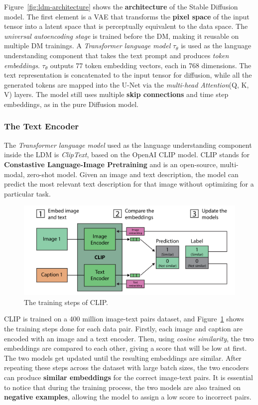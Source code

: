 \documentclass[preprint]{elsarticle}
\begin{document}
Figure~\ref{fig:ldm-architecture} shows the \textbf{architecture} of the Stable Diffusion model.
The first element is a VAE that transforms the \textbf{pixel space} of the input tensor into a latent space that is  perceptually equivalent to the data space. The \emph{universal autoencoding stage} is trained before the DM,  making it reusable on multiple DM trainings. A \emph{Transformer language model} $\tau_\theta$ is used as the language understanding component  that takes the text prompt and produces \emph{token embeddings}. $\tau_\theta$ outputs 77 token embedding vectors, each in 768 dimensions. 
The text representation is concatenated to the input tensor for diffusion, while all the generated tokens are mapped into the  U-Net via the \emph{multi-head Attention}(Q, K, V) layers. The model still uses multiple \textbf{skip connections} and time step embeddings,
as in the pure Diffusion model.



\subsubsection{The Text Encoder}

The \emph{Transformer language model} used as the language understanding component inside the LDM is \emph{ClipText}, based on the OpenAI CLIP model.
CLIP stands for \textbf{Constastive Language-Image Pretraining} and is an open-source, multi-modal, zero-shot model. 
Given an image and text description, the model can predict the most relevant text description for that image without 
optimizing for a particular task.

\begin{figure}[t]
	\centering
    \includegraphics[scale=0.85]{img/svg/Clip.png}
	\caption{The training steps of CLIP.}\label{fig:clip-training}
\end{figure}

CLIP is trained on a 400 million image-text pairs dataset, and Figure~\ref{fig:clip-training} shows the training steps done for each 
data pair.
Firstly, each image and caption are encoded with an image and a text encoder. Then, using \emph{cosine similarity},  the two embeddings are compared to each other, giving a score that will be low at first. 
The two models get updated until the resulting embeddings are similar. 
After repeating these steps across the dataset with large batch sizes, the two encoders can produce \textbf{similar embeddings} 
for the correct image-text pairs. It is essential to notice that during the training process, 
the two models are also trained on \textbf{negative examples}, allowing the model to assign a low score to incorrect pairs.
\end{document}
